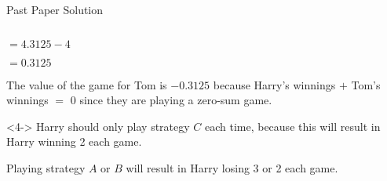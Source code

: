\documentclass[8pt]{beamer}
\begin{document}
\begin{frame}{Past Paper Solution}
\begin{columns}
\begin{column}{.5\linewidth}
\begin{solution}
		$=4.3125-4$

		 $=0.3125$

		 The value of the game for Tom is  $-0.3125$ because Harry's winnings  $+$ Tom's winnings  $=$ 0 since they are playing a zero-sum game.
	\end{solution}
	\begin{solution}<4->
		Harry should only play strategy $C$ each time, because this will result in Harry winning 2 each game.

		Playing strategy  $A$ or $B$ will result in Harry losing 3 or 2 each game.
	\end{solution}
	\end{column}
	\end{columns}
\end{frame}
\end{document}
